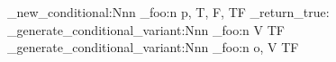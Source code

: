 \prg_new_conditional:Nnn
  \module_foo:n
  { p, T, F, TF }
  { \prg_return_true: }
\prg_generate_conditional_variant:Nnn
  \module_foo:n
  { V }
  { TF }
\prg_generate_conditional_variant:Nnn  %
  \module_foo:n
  { o, V }
  { TF }
